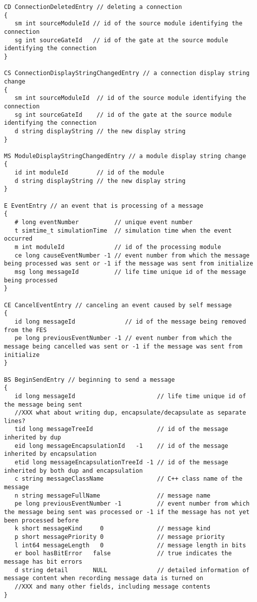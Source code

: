\begin{verbatim}
CD ConnectionDeletedEntry // deleting a connection
{
   sm int sourceModuleId // id of the source module identifying the connection
   sg int sourceGateId   // id of the gate at the source module identifying the connection
}

CS ConnectionDisplayStringChangedEntry // a connection display string change
{
   sm int sourceModuleId  // id of the source module identifying the connection
   sg int sourceGateId    // id of the gate at the source module identifying the connection
   d string displayString // the new display string
}

MS ModuleDisplayStringChangedEntry // a module display string change
{
   id int moduleId        // id of the module
   d string displayString // the new display string
}

E EventEntry // an event that is processing of a message
{
   # long eventNumber          // unique event number
   t simtime_t simulationTime  // simulation time when the event occurred
   m int moduleId              // id of the processing module
   ce long causeEventNumber -1 // event number from which the message being processed was sent or -1 if the message was sent from initialize
   msg long messageId          // life time unique id of the message being processed
}

CE CancelEventEntry // canceling an event caused by self message
{
   id long messageId              // id of the message being removed from the FES
   pe long previousEventNumber -1 // event number from which the message being cancelled was sent or -1 if the message was sent from initialize
}

BS BeginSendEntry // beginning to send a message
{
   id long messageId                       // life time unique id of the message being sent
   //XXX what about writing dup, encapsulate/decapsulate as separate lines?
   tid long messageTreeId                  // id of the message inherited by dup
   eid long messageEncapsulationId   -1    // id of the message inherited by encapsulation
   etid long messageEncapsulationTreeId -1 // id of the message inherited by both dup and encapsulation
   c string messageClassName               // C++ class name of the message
   n string messageFullName                // message name
   pe long previousEventNumber -1          // event number from which the message being sent was processed or -1 if the message has not yet been processed before
   k short messageKind     0               // message kind
   p short messagePriority 0               // message priority
   l int64 messageLength   0               // message length in bits
   er bool hasBitError   false             // true indicates the message has bit errors
   d string detail       NULL              // detailed information of message content when recording message data is turned on
   //XXX and many other fields, including message contents
}


\end{verbatim}
